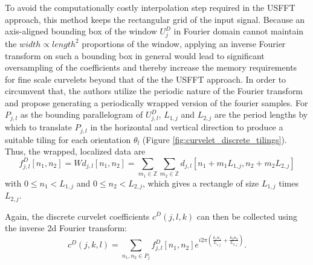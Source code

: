 To avoid the computationally costly interpolation step required in the USFFT
approach, this method keeps the rectangular grid of the input signal. Because
an axis-aligned bounding box of the window $U_j^D$ in Fourier domain cannot
maintain the $width \propto length^2$ proportions of the window, applying an
inverse Fourier transform on such a bounding box in general would lead to
significant oversampling of the coefficients and thereby increase the memory
requirements for fine scale curvelets beyond that of the the USFFT approach. In
order to circumvent that, the authors utilize the periodic nature of the
Fourier transform and propose generating a periodically wrapped version of the
fourier samples. For $P_{j, l}$ as the bounding parallelogram of $U_{j, l}^D$,
$L_{1, j}$ and $L_{2, j}$ are the period lengths by which to translate $P_{j,
l}$ in the horizontal and vertical direction to produce a suitable tiling for
each orientation $\theta_l$ (Figure \ref{fig:curvelet_discrete_tilings}). Thus,
the wrapped, localized data are
\begin{equation*}
    f_{j, l}^D[n_1, n_2] = W d_{j, l}[n_1, n_2] = \sum_{m_1 \in \mathbb{Z}} \sum_{m_2 \in \mathbb{Z}} d_{j, l}[n_1 + m_1 L_{1, j}, n_2 + m_2 L_{2, j}]
\end{equation*}
with $0 \leq n_1 < L_{1, j}$ and $0 \leq n_2 < L_{2, j}$, which gives a
rectangle of size $L_{1, j}$ times $L_{2, j}$.

Again, the discrete curvelet coefficients $c^D(j, l, k)$ can then be collected
using the inverse 2d Fourier transform:
\begin{equation*}
    c^D(j, k, l) = \sum_{n_1, n_2 \in P_j} f_{j, l}^D[n_1, n_2] e^{i 2 \pi (\frac{k_1 n_1}{L_{1, j}} + \frac{k_2 n_2}{L_{2,j}})}.
\end{equation*}
